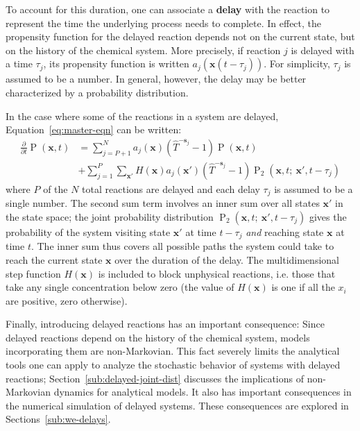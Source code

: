 \documentclass[english,letterpaper,12pt]{report}
\newcommand{\defkeywd}[1]{\textbf{#1}}
\renewcommand{\vec}[1]{\ensuremath{\mathbf{#1}}}
\DeclareMathOperator{\Prob}{P}
\newcommand{\delaytime}{\ensuremath{\tau}}
\begin{document}
\begin{doublespacing}
To account for this duration, one can associate a \defkeywd{delay} with the reaction to represent the time the underlying process needs to complete. In effect, the propensity function for the delayed reaction depends not on the current state, but on the history of the chemical system. More precisely, if reaction $j$ is delayed with a time $\delaytime_j$, its propensity function is written $a_j \left(\vec{x}(t - \delaytime_j) \right)$. For simplicity, $\delaytime_j$ is assumed to be a number. In general, however, the delay may be better characterized by a probability distribution.

In the case where some of the reactions in a system are delayed, Equation~\eqref{eq:master-eqn} can be written:
\begin{align}
    \frac{\partial}{\partial t} \Prob(\vec{x}, t) &= \sum_{j=P+1}^N a_j(\vec{x})(\hat{T}^{-\vec{s}_j} - 1)\Prob(\vec{x}, t) \\
                                                  &+ \sum_{j=1}^P \sum_{\vec{x}'} H(\vec{x}) a_j(\vec{x}') (\hat{T}^{-\vec{s}_j} - 1) \Prob_2(\vec{x}, t;\: \vec{x}', t - \delaytime_j)
    \label{eq:master-eqn-delay}
\end{align}
where $P$ of the $N$ total reactions are delayed and each delay $\delaytime_j$ is assumed to be a single number. The second sum term involves an inner sum over all states $\vec{x}'$ in the state space; the joint probability distribution $\Prob_2(\vec{x}, t;\: \vec{x}', t - \delaytime_j)$ gives the probability of the system visiting state $\vec{x}'$ at time $t - \delaytime_j$ \emph{and} reaching state $\vec{x}$ at time $t$. The inner sum thus covers all possible paths the system could take to reach the current state $\vec{x}$ over the duration of the delay. The multidimensional step function $H(\vec{x})$ is included to block unphysical reactions, i.e. those that take any single concentration below zero (the value of $H(\vec{x})$ is one if all the $x_i$ are positive, zero otherwise). 

Finally, introducing delayed reactions has an important consequence: Since delayed reactions depend on the history of the chemical system, models incorporating them are non-Markovian. This fact severely limits the analytical tools one can apply to analyze the stochastic behavior of systems with delayed reactions; Section~\ref{sub:delayed-joint-dist} discusses the implications of non-Markovian dynamics for analytical models. It also has important consequences in the numerical simulation of delayed systems. These consequences are explored in Sections~\ref{sub:we-delays}.


\end{doublespacing}
\end{document}
